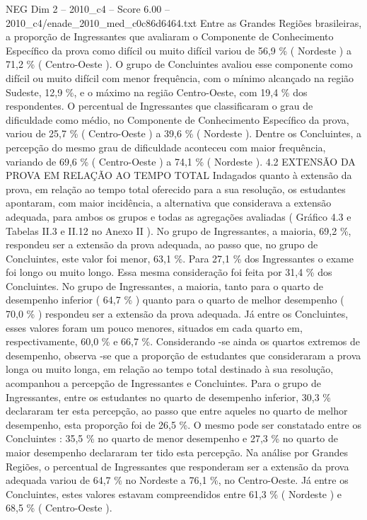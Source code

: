 \begin{textsample}{NEG Dim 2 – 2010\_c4 – Score 6.00 – 2010\_c4/enade\_2010\_med\_c0c86d6464.txt}
Entre as Grandes Regiões brasileiras, a proporção de Ingressantes que avaliaram o Componente de Conhecimento Específico da prova como difícil ou muito difícil variou de 56,9 \% ( Nordeste ) a 71,2 \% ( Centro-Oeste ).
O grupo de Concluintes avaliou esse componente como difícil ou muito difícil com menor frequência, com o mínimo alcançado na região Sudeste, 12,9 \%, e o máximo na região Centro-Oeste, com 19,4 \% dos respondentes.
O percentual de Ingressantes que classificaram o grau de dificuldade como médio, no Componente de Conhecimento Específico da prova, variou de 25,7 \% ( Centro-Oeste ) a 39,6 \% ( Nordeste ).
Dentre os Concluintes, a percepção do mesmo grau de dificuldade aconteceu com maior frequência, variando de 69,6 \% ( Centro-Oeste ) a 74,1 \% ( Nordeste ). 4.2 EXTENSÃO DA PROVA EM RELAÇÃO AO TEMPO TOTAL Indagados quanto à extensão da prova, em relação ao tempo total oferecido para a sua resolução, os estudantes apontaram, com maior incidência, a alternativa que considerava a extensão adequada, para ambos os grupos e todas as agregações avaliadas ( Gráfico 4.3 e Tabelas II.3 e II.12 no Anexo II ).
No grupo de Ingressantes, a maioria, 69,2 \%, respondeu ser a extensão da prova adequada, ao passo que, no grupo de Concluintes, este valor foi menor, 63,1 \%.
Para 27,1 \% dos Ingressantes o exame foi longo ou muito longo.
Essa mesma consideração foi feita por 31,4 \% dos Concluintes.
No grupo de Ingressantes, a maioria, tanto para o quarto de desempenho inferior ( 64,7 \% ) quanto para o quarto de melhor desempenho ( 70,0 \% ) respondeu ser a extensão da prova adequada.
Já entre os Concluintes, esses valores foram um pouco menores, situados em cada quarto em, respectivamente, 60,0 \% e 66,7 \%.
Considerando -se ainda os quartos extremos de desempenho, observa -se que a proporção de estudantes que consideraram a prova longa ou muito longa, em relação ao tempo total destinado à sua resolução, acompanhou a percepção de Ingressantes e Concluintes.
Para o grupo de Ingressantes, entre os estudantes no quarto de desempenho inferior, 30,3 \% declararam ter esta percepção, ao passo que entre aqueles no quarto de melhor desempenho, esta proporção foi de 26,5 \%.
O mesmo pode ser constatado entre os Concluintes : 35,5 \% no quarto de menor desempenho e 27,3 \% no quarto de maior desempenho declararam ter tido esta percepção.
Na análise por Grandes Regiões, o percentual de Ingressantes que responderam ser a extensão da prova adequada variou de 64,7 \% no Nordeste a 76,1 \%, no Centro-Oeste.
Já entre os Concluintes, estes valores estavam compreendidos entre 61,3 \% ( Nordeste ) e 68,5 \% ( Centro-Oeste ).

\end{textsample}
